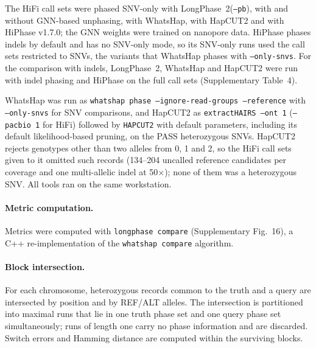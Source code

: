 \documentclass[11pt,a4paper]{article}
\newcommand{\toolname}{LongPhase~2\xspace}
\newcommand{\whatshap}{WhatsHap\xspace}
\newcommand{\hapcut}{HapCUT2\xspace}
\newcommand{\code}[1]{\texttt{\small #1}}
\begin{document}
The HiFi call sets were phased SNV-only with \toolname (\texttt{--pb}), with and without GNN-based unphasing, with \whatshap, with \hapcut and with HiPhase v1.7.0\cite{holt2024hiphase}; the GNN weights were trained on nanopore data.  HiPhase phases indels by default and has no SNV-only mode, so its SNV-only runs used the call sets restricted to SNVs, the variants that \whatshap phases with \texttt{--only-snvs}.  For the comparison with indels, \toolname, \whatshap and \hapcut were run with indel phasing and HiPhase on the full call sets (Supplementary Table~4).

\whatshap was run as \texttt{whatshap phase --ignore-read-groups --reference} with \texttt{--only-snvs} for SNV comparisons, and \hapcut as \texttt{extractHAIRS --ont 1} (\texttt{--pacbio 1} for HiFi) followed by \texttt{HAPCUT2} with default parameters, including its default likelihood-based pruning, on the PASS heterozygous SNVs.  \hapcut rejects genotypes other than two alleles from 0, 1 and 2, so the HiFi call sets given to it omitted such records (134--204 uncalled reference candidates per coverage and one multi-allelic indel at 50$\times$); none of them was a heterozygous SNV.  All tools ran on the same workstation.

\paragraph{Metric computation.} Metrics were computed with \code{longphase compare} (Supplementary Fig.~16), a C++ re-implementation of the \code{whatshap compare} algorithm\cite{patterson2015whatshap}.

\paragraph{Block intersection.} For each chromosome, heterozygous records common to the truth and a query are intersected by position and by REF/ALT alleles. The intersection is partitioned into maximal runs that lie in one truth phase set and one query phase set simultaneously; runs of length one carry no phase information and are discarded. Switch errors and Hamming distance are computed within the surviving blocks.
\end{document}
